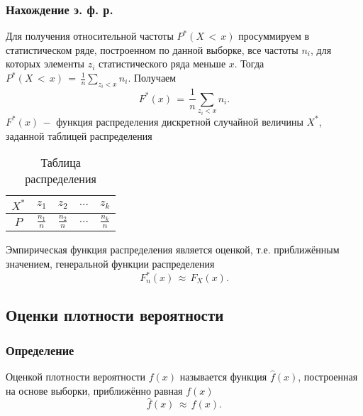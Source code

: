 \subsubsection{Нахождение э. ф. р.}
\begin{flushleft}
	Для получения относительной частоты $ P^*(X \,<\, x)$ просуммируем в статистическом ряде, построенном по данной выборке, все частоты $n_i$, для которых элементы $z_i$ статистического ряда меньше $x$. Тогда $P^*(X \,<\, x)\,=\,\frac{1}{n}\displaystyle\sum_{z_i<x} n_i$. Получаем
	\begin{equation}
		\label{20} F^*(x)\,=\,\frac{1}{n}\displaystyle\sum_{z_i<x} n_i.
	\end{equation}
	$F^*(x)\,-$ функция распределения дискретной случайной величины	$X^*$, заданной таблицей распределения
	\begin{table}[H]
		\begin{center}
			\begin{tabular}{|c|c|c|c|c|}
				\hline
				$X^*$ & $z_1$ & $z_2$ & $...$ & $z_k$\\
				\hline
				$P$ & $\frac{n_1}{n}$ & $\frac{n_2}{n}$ & $...$ & $\frac{n_k}{n}$\\
				\hline
			\end{tabular}
		\end{center}
		\caption{\label{tab:1} Таблица распределения}
	\end{table}
	Эмпирическая функция распределения является оценкой, т.е. приближённым значением, генеральной функции распределения
	\begin{equation}
		\label{21} F_n^*(x)\,\approx\,F_X(x).
	\end{equation}
\end{flushleft}

\subsection{Оценки плотности вероятности}
\subsubsection{Определение}
\begin{flushleft}
	Оценкой плотности вероятности $f(x)$ называется функция $\hat{f}(x)$, построенная на основе выборки, приближённо равная $f(x)$
	\begin{equation}
		\label{22} \hat{f}(x)\,\approx\, f(x).
	\end{equation}
\end{flushleft}

